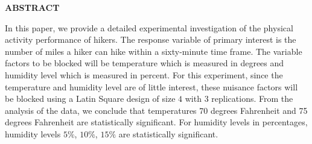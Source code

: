 
\begin{center}

\end{center}

\begin{center}
{{\bf\fontsize{14pt}{14.5pt}\selectfont \uppercase{ABSTRACT}}}
\end{center}

\doublespacing
{}



\begin{center}
	\begin{doublespace}
	\end{doublespace}
\end{center}


In this paper, we provide a detailed experimental investigation of the physical activity performance of hikers. The response variable of primary interest is the number of miles a hiker can hike within a sixty-minute time frame. The variable factors to be blocked will be temperature which is measured in degrees and humidity level which is measured in percent. For this experiment, since the temperature and humidity level are of little interest, these nuisance factors will be blocked using a Latin Square design of size $4$ with $3$ replications. From the analysis of the data, we conclude that temperatures 70 degrees Fahrenheit and 75 degrees Fahrenheit are statistically significant. For humidity levels in percentages, humidity levels $5\%$, $10\%$, $15\%$ are statistically significant. 

